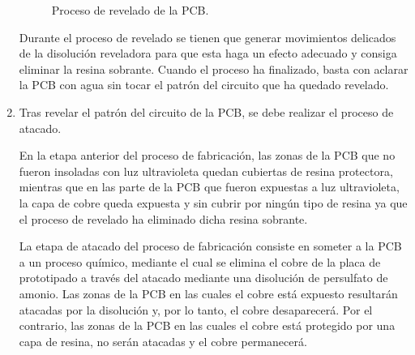 \begin{enumerate}
    \begin{figure}[H]
    \centering
    \caption{Proceso de revelado de la \ac{PCB}.}
    \end{figure}
    
    Durante el proceso de revelado se tienen que generar movimientos delicados de la disolución reveladora para que esta haga un efecto adecuado y consiga eliminar la resina sobrante. Cuando el proceso ha finalizado, basta con aclarar la \ac{PCB} con agua sin tocar el patrón del circuito que ha quedado revelado.
    
    \item Tras revelar el patrón del circuito de la \ac{PCB}, se debe realizar el proceso de atacado.
    
   En la etapa anterior del proceso de fabricación, las zonas de la \ac{PCB} que no fueron insoladas con luz ultravioleta quedan cubiertas de resina protectora, mientras que en las parte de la \ac{PCB} que fueron expuestas a luz ultravioleta, la capa de cobre queda expuesta y sin cubrir por ningún tipo de resina ya que el proceso de revelado ha eliminado dicha resina sobrante.
   
   La etapa de atacado del proceso de fabricación consiste en someter a la \ac{PCB} a un proceso químico, mediante el cual se elimina el cobre de la placa de prototipado a través del atacado mediante una disolución de persulfato de amonio. Las zonas de la \ac{PCB} en las cuales el cobre está expuesto resultarán atacadas por la disolución y, por lo tanto, el cobre desaparecerá. Por el contrario, las zonas de la \ac{PCB} en las cuales el cobre está protegido por una capa de resina, no serán atacadas y el cobre permanecerá.
   

\end{enumerate}
